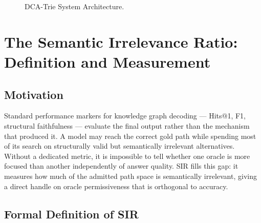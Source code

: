 \begin{figure}
{
  }%
  \caption[DCA-Trie System Architecture]{DCA-Trie System Architecture.}
  \label{fig:architecture}
\end{figure}

\section{The Semantic Irrelevance Ratio: Definition and Measurement}
\label{sec:ch3sir}

\subsection{Motivation}

Standard performance markers for knowledge graph decoding — Hits@1, F1, structural faithfulness — evaluate the final output rather than the mechanism that produced it. A model may reach the correct gold path while spending most of its search on structurally valid but semantically irrelevant alternatives. Without a dedicated metric, it is impossible to tell whether one oracle is more focused than another independently of answer quality. SIR fills this gap: it measures how much of the admitted path space is semantically irrelevant, giving a direct handle on oracle permissiveness that is orthogonal to accuracy.

\subsection{Formal Definition of SIR}

